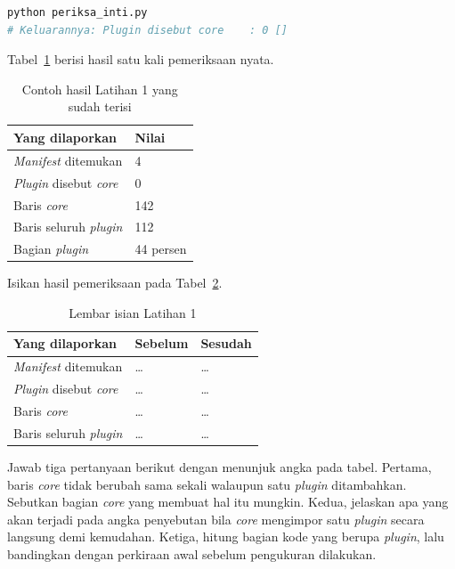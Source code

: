 \begin{lstlisting}[language=bash, caption={Menghitung penyebutan \textit{plugin}
  di dalam inti}, label=lst:jalankan-periksa-inti]
python periksa_inti.py
# Keluarannya: Plugin disebut core    : 0 []
\end{lstlisting}

Tabel~\ref{tab:lat1plugin-contoh} berisi hasil satu kali pemeriksaan nyata.

\begin{table}[htbp]
  \centering
  \caption{Contoh hasil Latihan 1 yang sudah terisi}
  \label{tab:lat1plugin-contoh}
  \begin{tabularx}{\textwidth}{|X|l|}
    \hline
    \textbf{Yang dilaporkan} & \textbf{Nilai} \\
    \hline
    \textit{Manifest} ditemukan & 4 \\
    \hline
    \textit{Plugin} disebut \textit{core} & 0 \\
    \hline
    Baris \textit{core} & 142 \\
    \hline
    Baris seluruh \textit{plugin} & 112 \\
    \hline
    Bagian \textit{plugin} & 44 persen \\
    \hline
  \end{tabularx}
\end{table}

Isikan hasil pemeriksaan pada Tabel~\ref{tab:lat1plugin-hasil}.

\begin{table}[htbp]
  \centering
  \caption{Lembar isian Latihan 1}
  \label{tab:lat1plugin-hasil}
  \begin{tabularx}{\textwidth}{|X|l|l|}
    \hline
    \textbf{Yang dilaporkan} & \textbf{Sebelum} & \textbf{Sesudah} \\
    \hline
    \textit{Manifest} ditemukan & \dots & \dots \\
    \hline
    \textit{Plugin} disebut \textit{core} & \dots & \dots \\
    \hline
    Baris \textit{core} & \dots & \dots \\
    \hline
    Baris seluruh \textit{plugin} & \dots & \dots \\
    \hline
  \end{tabularx}
\end{table}

Jawab tiga pertanyaan berikut dengan menunjuk angka pada tabel. Pertama, baris
\textit{core} tidak berubah sama sekali walaupun satu \textit{plugin} ditambahkan.
Sebutkan bagian \textit{core} yang membuat hal itu mungkin. Kedua, jelaskan apa yang akan
terjadi pada angka penyebutan bila \textit{core} mengimpor satu \textit{plugin} secara
langsung demi kemudahan. Ketiga, hitung bagian kode yang berupa \textit{plugin},
lalu bandingkan dengan perkiraan awal sebelum pengukuran dilakukan.

